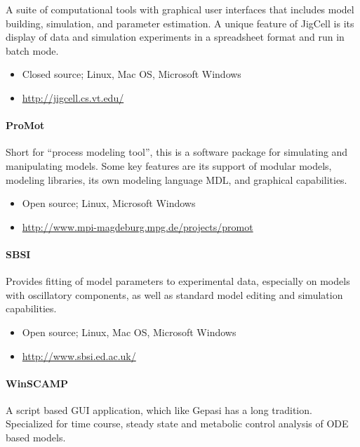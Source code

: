 A suite of computational tools with graphical user interfaces that
includes model building, simulation, and parameter estimation. A unique
feature of JigCell is its display of data and simulation experiments in
a spreadsheet format and run in batch mode.

\begin{itemize}
\item
  Closed source; Linux, Mac OS, Microsoft Windows
\item
  \url{http://jigcell.cs.vt.edu/}
\end{itemize}
\paragraph{ProMot \autocite{mirschel2009promot}}

Short for ``process modeling tool'', this is a software package for
simulating and manipulating models. Some key features are its support of
modular models, modeling libraries, its own modeling language MDL, and
graphical capabilities.

\begin{itemize}
\item
  Open source; Linux, Microsoft Windows
\item
  \url{http://www.mpi-magdeburg.mpg.de/projects/promot}
\end{itemize}
\paragraph{SBSI \autocite{adams2013sbsi}}

Provides fitting of model parameters to experimental data, especially on
models with oscillatory components, as well as standard model editing
and simulation capabilities.

\begin{itemize}
\item
  Open source; Linux, Mac OS, Microsoft Windows
\item
  \url{http://www.sbsi.ed.ac.uk/}
\end{itemize}
\paragraph{WinSCAMP \autocite{SauroF91} \autocite{SauroScamp93}}

A script based GUI application, which like Gepasi has a long tradition.
Specialized for time course, steady state and metabolic control analysis
of ODE based models.

